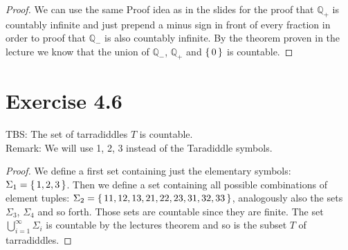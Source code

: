 \documentclass{article} %
\newcommand{\homeworkNumber}{4}
\begin{document}
\begin{proof}
We can use the same Proof idea as in the slides for the proof that $\mathbb{Q}_+$ is countably infinite and just prepend a minus sign in front of every fraction in order to proof that $\mathbb{Q}_-$ is also countably infinite. By the theorem proven in the lecture we know that the union of $\mathbb{Q}_-$, $\mathbb{Q}_+$ and $\set{0}$ is countable.
\end{proof}

\newpage

\section*{Exercise \homeworkNumber.6}
TBS: The set of tarradiddles $T$ is countable.\\
Remark: We will use 1, 2, 3 instead of the Taradiddle symbols.
\begin{proof}
We define a first set containing just the elementary symbols: $\Sigma_1 = \set{1, 2, 3}$. Then we define a set containing all possible combinations of element tuples: $\Sigma_2 = \set{11, 12, 13, 21, 22, 23, 31, 32, 33}$, analogously also the sets $\Sigma_3$, $\Sigma_4$ and so forth. Those sets are countable since they are finite. The set $\bigcup_{i = 1}^\infty \Sigma_i$ is countable by the lectures theorem and so is the subset $T$ of tarradiddles.
\end{proof}
\end{document}
